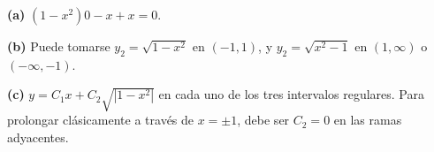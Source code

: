 \noindent\textbf{(a)} \((1-x^2)0-x+x=0\).

\noindent\textbf{(b)} Puede tomarse \(y_2=\sqrt{1-x^2}\) en \((-1,1)\), y \(y_2=\sqrt{x^2-1}\) en \((1,\infty)\) o \((-\infty,-1)\).

\noindent\textbf{(c)} \(y=C_1x+C_2\sqrt{|1-x^2|}\) en cada uno de los tres intervalos regulares. Para prolongar clásicamente a través de \(x=\pm1\), debe ser \(C_2=0\) en las ramas adyacentes.
